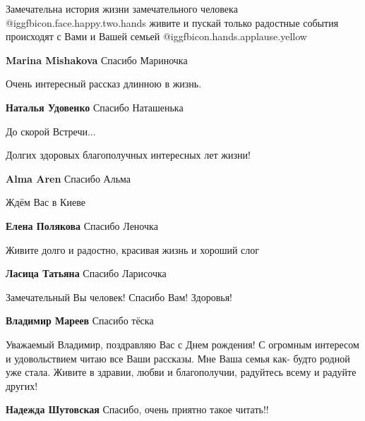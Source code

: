  
 
 
 
 


Замечательна история жизни замечательного человека
@igg{fbicon.face.happy.two.hands} живите и пускай только радостные события
происходят с Вами и Вашей семьей @igg{fbicon.hands.applause.yellow} 

\textbf{Marina Mishakova} Спасибо Мариночка

Очень интересный рассказ длинною в жизнь.


\textbf{Наталья Удовенко} Спасибо Наташенька

До скорой Встречи...

Долгих здоровых благополучных интересных лет жизни!

\textbf{Alma Aren} Спасибо Альма

Ждём Вас в Киеве

\textbf{Елена Полякова} Спасибо Леночка

Живите долго и радостно, красивая жизнь и хороший слог

\textbf{Ласица Татьяна} Спасибо Ларисочка

Замечательный Вы человек! Спасибо Вам! Здоровья!

\textbf{Владимир Мареев} Спасибо тёска


Уважаемый Владимир, поздравляю Вас с Днем рождения! С огромным интересом и
удовольствием читаю все Ваши рассказы. Мне Ваша семья как- будто родной уже
стала. Живите в здравии, любви и благополучии, радуйтесь всему и радуйте
других!

\textbf{Надежда Шутовская} Спасибо, очень приятно такое читать!!

